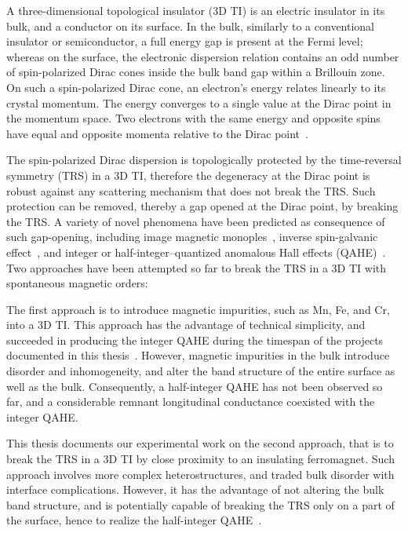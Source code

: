 A three-dimensional topological insulator (3D TI) is an electric insulator in its bulk, and a conductor on its surface. In the bulk, similarly to a conventional insulator or semiconductor, a full energy gap is present at the Fermi level; whereas on the surface, the electronic dispersion relation contains an odd number of spin-polarized Dirac cones inside the bulk band gap within a Brillouin zone. On such a spin-polarized Dirac cone, an electron's energy relates linearly to its crystal momentum. The energy converges to a single value at the Dirac point in the momentum space. Two electrons with the same energy and opposite spins have equal and opposite momenta relative to the Dirac point~\cite{TI_Qi, TI_Col}.

The spin-polarized Dirac dispersion is topologically protected by the time-reversal symmetry (TRS) in a 3D TI, therefore the degeneracy at the Dirac point is robust against any scattering mechanism that does not break the TRS. Such protection can be removed, thereby a gap opened at the Dirac point, by breaking the TRS. A variety of novel phenomena have been predicted as consequence of such gap-opening, including image magnetic monoples~\cite{TI_birth, TI_monopole}, inverse spin-galvanic effect~\cite{ISG}, and integer or half-integer--quantized anomalous Hall effects (QAHE)~\cite{TI_Col, QAH_TI_Yu}. Two approaches have been attempted so far to break the TRS in a 3D TI with spontaneous magnetic orders:

The first approach is to introduce magnetic impurities, such as Mn, Fe, and Cr, into a 3D TI. This approach has the advantage of technical simplicity, and succeeded in producing the integer QAHE during the timespan of the projects documented in this thesis~\cite{Chang2013, Kou2014}. However, magnetic impurities in the bulk introduce disorder and inhomogeneity, and alter the band structure of the entire surface as well as the bulk. Consequently, a half-integer QAHE has not been observed so far, and a considerable remnant longitudinal conductance coexisted with the integer QAHE.

This thesis documents our experimental work on the second approach, that is to break the TRS in a 3D TI by close proximity to an insulating ferromagnet. Such approach involves more complex heterostructures, and traded bulk disorder with interface complications. However, it has the advantage of not altering the bulk band structure, and is potentially capable of breaking the TRS only on a part of the surface, hence to realize the half-integer QAHE~\cite{TI_Col}.

